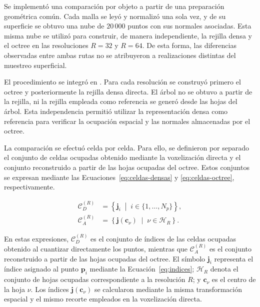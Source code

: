 Se implementó una comparación por objeto a partir de una preparación geométrica común. Cada malla se leyó y normalizó una sola vez, y de su superficie se obtuvo una nube de $20\,000$ puntos con sus normales asociadas. Esta misma nube se utilizó para construir, de manera independiente, la rejilla densa y el octree en las resoluciones $R=32$ y $R=64$. De esta forma, las diferencias observadas entre ambas rutas no se atribuyeron a realizaciones distintas del muestreo superficial.

El procedimiento se integró en \protect{}. Para cada resolución se construyó primero el octree y posteriormente la rejilla densa directa. El árbol no se obtuvo a partir de la rejilla, ni la rejilla empleada como referencia se generó desde las hojas del árbol. Esta independencia permitió utilizar la representación densa como referencia para verificar la ocupación espacial y las normales almacenadas por el octree.

La comparación se efectuó celda por celda. Para ello, se definieron
por separado el conjunto de celdas ocupadas obtenido mediante la
voxelización directa y el conjunto reconstruido a partir de las hojas
ocupadas del octree. Estos conjuntos se expresan mediante las
Ecuaciones~\eqref{eq:celdas-densas} y
\eqref{eq:celdas-octree}, respectivamente.

\begin{subequations}\label{eq:conjuntos-celdas}
\begin{align}
\mathcal C_D^{(R)}
&=
\left\{
\mathbf j_i
\;\middle|\;
i\in\{1,\ldots,N_p\}
\right\},
\label{eq:celdas-densas}\\
\mathcal C_A^{(R)}
&=
\left\{
\mathbf j(\mathbf c_\nu)
\;\middle|\;
\nu\in\mathcal H_R
\right\}.
\label{eq:celdas-octree}
\end{align}
\end{subequations}

En estas expresiones, $\mathcal C_D^{(R)}$ es el conjunto de índices
de las celdas ocupadas obtenido al cuantizar directamente los puntos,
mientras que $\mathcal C_A^{(R)}$ es el conjunto reconstruido a partir
de las hojas ocupadas del octree. El símbolo $\mathbf j_i$ representa
el índice asignado al punto $\mathbf p_i$ mediante la
Ecuación~\eqref{eq:indices}; $\mathcal H_R$ denota el conjunto de hojas
ocupadas correspondiente a la resolución $R$; y $\mathbf c_\nu$ es el
centro de la hoja $\nu$. Los índices $\mathbf j(\mathbf c_\nu)$ se
calcularon mediante la misma transformación espacial y el mismo
recorte empleados en la voxelización directa.

